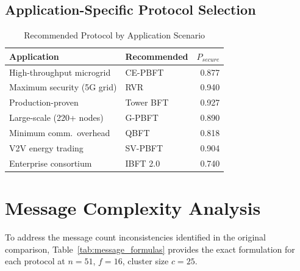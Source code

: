 \documentclass[10pt,twocolumn,letterpaper]{article}
\begin{document}
\subsection{Application-Specific Protocol Selection}

\begin{table}[htbp]
\caption{Recommended Protocol by Application Scenario}
\label{tab:recommendations}
\centering
\scriptsize
\begin{tabular}{@{}p{2.8cm}lr@{}}
\toprule
\textbf{Application} & \textbf{Recommended} & \textbf{$P_{secure}$} \\
\midrule
High-throughput microgrid & CE-PBFT & 0.877 \\
Maximum security (5G grid) & RVR & 0.940 \\
Production-proven & Tower BFT & 0.927 \\
Large-scale (220+ nodes) & G-PBFT & 0.890 \\
Minimum comm.\ overhead & QBFT & 0.818 \\
V2V energy trading & SV-PBFT & 0.904 \\
Enterprise consortium & IBFT 2.0 & 0.740 \\
\bottomrule
\end{tabular}
\end{table}

\section{Message Complexity Analysis}
\label{sec:messages}

To address the message count inconsistencies identified in the original comparison, Table~\ref{tab:message_formulas} provides the exact formulation for each protocol at $n = 51$, $f = 16$, cluster size $c = 25$.
\end{document}
